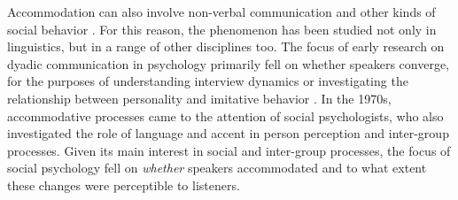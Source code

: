 \documentclass[output=paper,
modfonts
]{langscibook}
\begin{document}
Accommodation can also involve non-verbal communication and other kinds of social behavior \citep{hall_behavioural_2013, dijksterhuis_perception-behavior_2001}. For this reason, the phenomenon has been studied not only in linguistics, but in a range of other disciplines too. The focus of early research on dyadic communication in psychology primarily fell on whether speakers converge, for the purposes of understanding interview dynamics \citep[e.g.][]{matarazzo_interviewer_1963} or investigating the relationship between personality and imitative behavior \citep[e.g.][]{natale_convergence_1975}. In the 1970s, accommodative processes came to the attention of social psychologists, who also investigated the role of language and accent in person perception and inter-group processes. %
% 
% 
Given its main interest in social and inter-group processes, the focus of social psychology fell on \textit{whether} speakers accommodated and to what extent these changes were perceptible to listeners.
% 
% 
\end{document}
